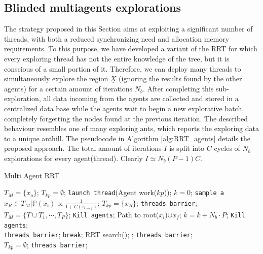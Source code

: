 \subsection{Blinded multiagents explorations}
\label{subsec:MT_04}

The strategy proposed in this Section aims at exploiting a significant number of threads, with both a  reduced synchronizing need and allocation memory requirements.
To this purpose, we have developed a variant of the RRT for which every exploring thread has not the entire knowledge of the tree, but it is conscious of a small portion of it. Therefore, we can deploy many threads to simultaneously explore the region $\underline{X}$ (ignoring the results found by the other agents) for a certain amount of iterations $N_b$. After completing this sub-exploration, all data incoming from the agents are collected and stored in a centralized data base while the agents wait to begin a new explorative batch, completely forgetting the nodes found at the previous iteration. 
The described behaviour resembles one of many exploring ants, which reports the exploring data to a unique anthill.  The pseudocode in Algorithm \ref{alg:RRT_agents} details the proposed approach. The total amount of iterations $I$ is split into $C$ cycles of $N_b$ explorations for every agent(thread). 
Clearly $I \simeq N_b (P-1) C$.

\begin{algorithm}
\caption{Multi Agent RRT}\label{alg:RRT_agents}
\begin{algorithmic}[1]
\State $T_M=\lbrace x_o \rbrace$; 
\State $T_{kp} = \emptyset$;
\State \texttt{launch thread}(Agent work($kp$));
\EndFor
\State $k=0$;
	\State \texttt{sample a} $x_R \in T_M \vert \mathbb{P}(x_i) \propto \frac{1}{1+C(\tau_{i \rightarrow f})}$;
	\State $T_{kp} = \lbrace x_{R} \rbrace$;
	\EndFor
	\State \texttt{threads barrier};
	\State $T_M = \lbrace T \cup T_1, \cdots, T_P \rbrace$;
		\State \texttt{Kill agents};
		\State \Return Path to root($x_i$)$ \cup x_f$;	
	\EndIf
	\State $k=k+N_b \cdot P$;
\EndWhile
	\State \texttt{Kill agents};
\EndProcedure
\\
	\State \texttt{threads barrier};
	\State \texttt{break};
	\EndIf
\State RRT search(); ;
	\State \texttt{threads barrier};
\EndWhile
\EndProcedure
\\
	\State $T_{kp} = \emptyset$;
	\EndFor
	\State \texttt{threads barrier};
\EndProcedure
\end{algorithmic}
\end{algorithm}

